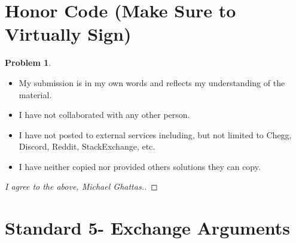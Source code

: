 \documentclass[11pt]{article}
\theoremstyle{definition}
\theoremstyle{definition}
\newtheorem{required}{Problem}
\theoremstyle{definition}
\begin{document}
\section{Honor Code (Make Sure to Virtually Sign)} \label{HonorCode}

\begin{required}
\noindent 
\begin{itemize}
\item My submission is in my own words and reflects my understanding of the material.
\item I have not collaborated with any other person.
\item I have not posted to external services including, but not limited to Chegg, Discord, Reddit, StackExchange, etc.
\item I have neither copied nor provided others solutions they can copy.
\end{itemize}

\end{required}

\begin{proof}[I agree to the above, Michael Ghattas.]
\end{proof}



\newpage
\section{Standard 5- Exchange Arguments}
\end{document}
